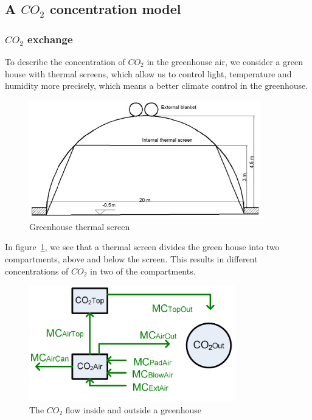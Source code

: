 \documentclass[a4paper]{article}
\numberwithin{equation}{section}
\begin{document}
\subsection{A \texorpdfstring{\(CO_2\)}{} concentration model}
\subsubsection{\texorpdfstring{\(CO_2\)}{} exchange}
To describe the concentration of \(CO_2\) in the greenhouse air, we consider a green house with thermal screens, which allow us to control light, temperature and humidity more precisely, which means a better climate control in the greenhouse.
\begin{figure}[H]
  \centering
  \includegraphics[width=0.9\textwidth]{thrscr.png}
  \caption{Greenhouse thermal screen}\label{fig:thrscr}
\end{figure}

In figure~\ref{fig:thrscr}, we see that a thermal screen divides the green house into two compartments, above and below the screen.
This results in different concentrations of \(CO_2\) in two of the compartments.
\begin{figure}[H]
  \centering
  \includegraphics[width=0.8\textwidth]{CO2}
  \caption{The \(CO_2\) flow inside and outside a greenhouse}\label{fig:CO2}
\end{figure}
\end{document}
